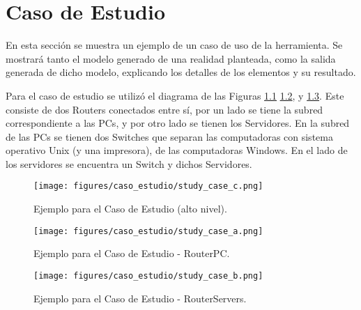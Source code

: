 \chapter{Caso de Estudio} \label{Caso de Estudio}

En esta sección se muestra un ejemplo de un caso de uso de la herramienta. Se mostrará tanto el modelo generado de una realidad planteada, como la salida generada de dicho modelo, explicando los detalles de los elementos y su resultado.

Para el caso de estudio se utilizó el diagrama de las Figuras  \ref{fig:caso_estudio} \ref{fig:caso_estudio_pc}, y \ref{fig:caso_estudio_servers}. Este consiste de dos Routers conectados entre sí, por un lado se tiene la subred correspondiente a las PCs, y por otro lado se tienen los Servidores. En la subred de las PCs se tienen dos Switches que separan las computadoras con sistema operativo Unix (y una impresora), de las computadoras Windows. En el lado de los servidores se encuentra un Switch y dichos Servidores.

\begin{figure}[htbp]
    \centering
    \texttt{[image: figures/caso\_estudio/study\_case\_c.png]}
    \caption{Ejemplo para el Caso de Estudio (alto nivel).}
    \label{fig:caso_estudio}
\end{figure}

\begin{figure}[htbp]
    \centering
    \texttt{[image: figures/caso\_estudio/study\_case\_a.png]}
    \caption{Ejemplo para el Caso de Estudio - RouterPC.}
    \label{fig:caso_estudio_pc}
\end{figure}

\begin{figure}[htbp]
    \centering
    \texttt{[image: figures/caso\_estudio/study\_case\_b.png]}
    \caption{Ejemplo para el Caso de Estudio - RouterServers.}
    \label{fig:caso_estudio_servers}
\end{figure}

